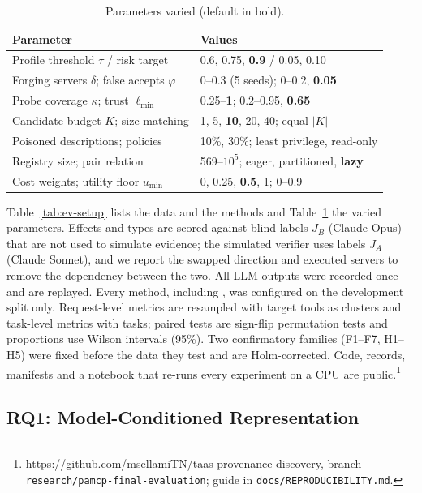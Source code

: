 \begin{table}[t]
\centering
\caption{Parameters varied (default in bold).}
\label{tab:ev-params}
\scriptsize
\setlength{\tabcolsep}{2.5pt}
\begin{tabular}{@{}lp{4.3cm}@{}}
\toprule
Parameter & Values \\
\midrule
Profile threshold $\tau$ / risk target & 0.6, 0.75, \textbf{0.9} / 0.05, 0.10 \\
Forging servers $\delta$; false accepts $\varphi$ & 0--0.3 (5 seeds); 0--0.2, \textbf{0.05} \\
Probe coverage $\kappa$; trust $\ell_{\min}$ & 0.25--\textbf{1}; 0.2--0.95, \textbf{0.65} \\
Candidate budget $K$; size matching & 1, 5, \textbf{10}, 20, 40; equal $|K|$ \\
Poisoned descriptions; policies & 10\%, 30\%; least privilege, read-only \\
Registry size; pair relation & 569--$10^5$; eager, partitioned, \textbf{lazy} \\
Cost weights; utility floor $u_{\min}$ & 0, 0.25, \textbf{0.5}, 1; 0--0.9 \\
\bottomrule
\end{tabular}
\end{table}

Table~\ref{tab:ev-setup} lists the data and the methods and Table~\ref{tab:ev-params} the varied parameters.
Effects and types are scored against blind labels $J_B$ (Claude Opus) that are not used to simulate evidence;
the simulated verifier uses labels $J_A$ (Claude Sonnet), and we report the swapped direction and executed
servers to remove the dependency between the two. All LLM outputs were recorded once and are replayed. Every
method, including \pamcp{}, was configured on the development split only. Request-level metrics are resampled
with target tools as clusters and task-level metrics with tasks; paired tests are sign-flip permutation tests and
proportions use Wilson intervals (95\%). Two confirmatory families (F1--F7, H1--H5) were fixed before the data
they test and are Holm-corrected. Code, records, manifests and a notebook that re-runs every experiment on a
CPU are public.\footnote{\url{https://github.com/msellamiTN/taas-provenance-discovery}, branch
\texttt{research/pamcp-final-evaluation}; guide in \texttt{docs/REPRODUCIBILITY.md}.}

\subsection{RQ1: Model-Conditioned Representation}
\label{sec:ev-rq1}

